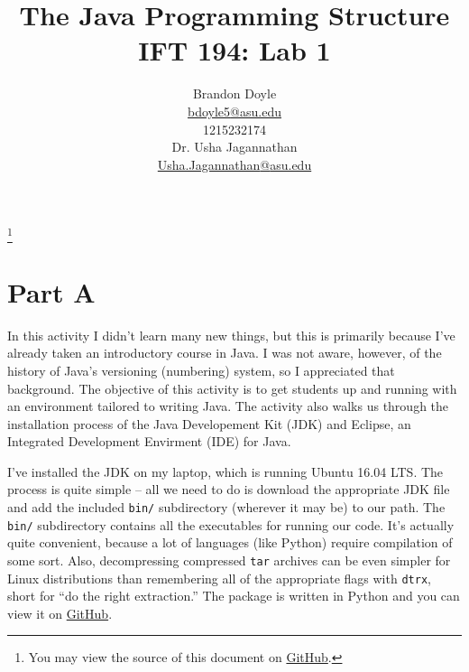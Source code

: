 \documentclass[leqno, 11pt]{article}
\title{\vspace{6ex}The Java Programming Structure\\
  \Large IFT 194: Lab 1}
\author{Brandon Doyle\\
\href{mailto:bdoyle@asu.edu}{bdoyle5\mbox{}{\fontfamily{ptm}\selectfont @}\mbox{}asu.edu}\\
1215232174\\[1em]
Dr. Usha Jagannathan\\
\href{mailto:Usha.Jagannathan@asu.edu}{Usha.Jagannathan\mbox{}{\fontfamily{ptm}\selectfont @}\mbox{}asu.edu}}
\newcommand\blfootnote[1]{%
  \begingroup
    \renewcommand\thefootnote{}\footnote{#1}
    \addtocounter{footnote}{-1}
  \endgroup
}
\begin{document}
\begin{titlepage}
\clearpage\maketitle
\thispagestyle{empty}
\end{titlepage}
\blfootnote{You may view the source of this document on \href{https://github.com/bjd2385/IFT_194_labs/blob/master/lab_1.tex}{GitHub}.}
\section*{Part A}
In this activity I didn't learn many new things, but this is primarily 
because I've already taken an introductory course in Java. I was not aware,
however, of the history of Java's versioning (numbering) system, so I appreciated
that background. The objective of this activity is to get students up and running
with an environment tailored to writing Java. The activity also walks us
through the installation process of the Java Developement Kit (JDK) and Eclipse,
an Integrated Development Envirment (IDE) for Java.

I've installed the JDK on my laptop, which is running Ubuntu 16.04 LTS. The process
is quite simple -- all we need to do is download the appropriate JDK file and add the
included \texttt{bin/} subdirectory (wherever it may be) to our path. The \texttt{bin/}
subdirectory contains all the executables for running our code. It's actually quite convenient, because a lot of languages (like  Python) require compilation of some sort. Also, decompressing compressed \texttt{tar} archives can be even simpler for Linux distributions than remembering all of the appropriate flags with \texttt{dtrx}, short for ``do the right extraction.'' The package is written in Python and you can view it on \href{https://github.com/moonpyk/dtrx}{GitHub}.
\end{document}
